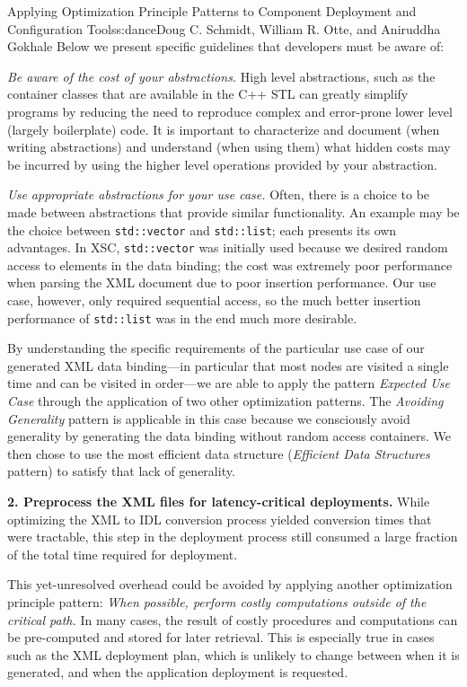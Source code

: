 \begin{aosachapter}{Applying Optimization Principle Patterns to Component Deployment and
                    Configuration Tools}{s:dance}{Doug C. Schmidt, William R. Otte, and Aniruddha Gokhale}
Below we present specific guidelines that developers must be aware of:

\begin{aosaitemize}
\item
  \emph{Be aware of the cost of your abstractions.} High level
  abstractions, such as the container classes that are available in the
  C++ STL can greatly simplify programs by reducing the need to
  reproduce complex and error-prone lower level (largely boilerplate)
  code. It is important to characterize and document (when writing
  abstractions) and understand (when using them) what hidden costs may
  be incurred by using the higher level operations provided by your
  abstraction.
\item
  \emph{Use appropriate abstractions for your use case.} Often, there is
  a choice to be made between abstractions that provide similar
  functionality. An example may be the choice between
  \texttt{std::vector} and \texttt{std::list}; each presents its own
  advantages. In XSC, \texttt{std::vector} was initially used because we
  desired random access to elements in the data binding; the cost was
  extremely poor performance when parsing the XML document due to poor
  insertion performance. Our use case, however, only required sequential
  access, so the much better insertion performance of \texttt{std::list}
  was in the end much more desirable.
\end{aosaitemize}

By understanding the specific requirements of the particular use case of
our generated XML data binding---in particular that most nodes are
visited a single time and can be visited in order---we are able to apply
the pattern \emph{Expected Use Case} through the application of two
other optimization patterns. The \emph{Avoiding Generality} pattern is
applicable in this case because we consciously avoid generality by
generating the data binding without random access containers. We then
chose to use the most efficient data structure (\emph{Efficient Data
Structures} pattern) to satisfy that lack of generality.

\textbf{2. Preprocess the XML files for latency-critical deployments.} While
  optimizing the XML to IDL conversion process yielded conversion times
  that were tractable, this step in the deployment process still
  consumed a large fraction of the total time required for deployment.

  This yet-unresolved overhead could be avoided by applying another
  optimization principle pattern:
  \emph{When possible, perform costly computations outside of the
  critical path.} In many cases, the result of costly procedures and
  computations can be pre-computed and stored for later retrieval. This
  is especially true in cases such as the XML deployment plan, which is
  unlikely to change between when it is generated, and when the
  application deployment is requested.


\end{aosachapter}
